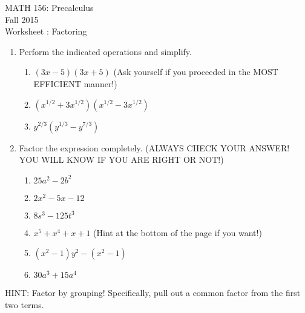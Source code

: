 \documentclass[11pt]{article}
\newcommand{\sect}{\textsection}
\begin{document}
\begin{center}MATH 156: Precalculus  \\ Fall 2015 \\ Worksheet \sect 1.3: Factoring \end{center}

\hrulefill

\begin{enumerate}
\item Perform the indicated operations and simplify.
\begin{enumerate}
\item $(3x-5)(3x+5)$ (Ask yourself if you proceeded in the MOST EFFICIENT manner!)
\vfill
\item $(x^{1/2}+3x^{1/2})(x^{1/2}-3x^{1/2})$
\vfill
\item $y^{2/3}(y^{1/3}-y^{7/3})$
\vfill
\end{enumerate}
\newpage
\item Factor the expression completely. (ALWAYS CHECK YOUR ANSWER! YOU WILL KNOW IF YOU ARE RIGHT OR NOT!)
\begin{enumerate}
\item $25a^2-2b^2$
\vfill
\item $2x^2-5x-12$
\vfill
\item $8s^3-125t^3$
\vfill
\item $x^5+x^4+x+1$ (Hint at the bottom of the page if you want!)
\vfill
\item $(x^2-1)y^2-(x^2-1)$ 
\vfill
\item $30a^3+15a^4$
\end{enumerate}

\end{enumerate}
\vfill
HINT: Factor by grouping! Specifically, pull out a common factor from the first two terms.
\end{document}
